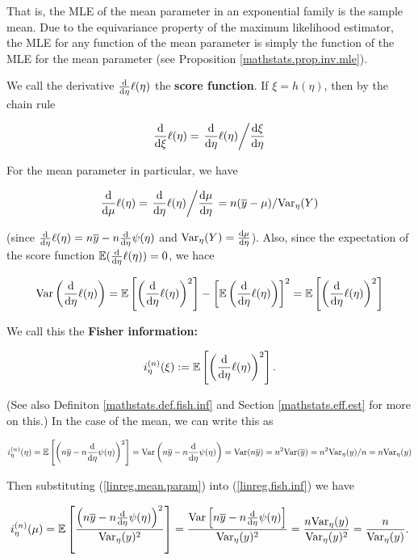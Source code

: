 \begin{enumerate}
That is, the MLE of the mean parameter in an exponential family is the sample mean. Due to the equivariance property of the maximum likelihood estimator, the MLE for any function of the mean parameter is simply the function of the MLE for the mean parameter (see Proposition \ref{mathstats.prop.inv.mle}). 

We call the derivative \(\frac{\mathrm{d} }{\mathrm{d} \eta} \ell(\eta) \) the \textbf{score function}. If \(\xi = h(\eta)\), then by the chain rule

\[
\frac{\mathrm{d} }{\mathrm{d} \xi} \ell(\eta) = \left. \frac{\mathrm{d} }{\mathrm{d} \eta} \ell(\eta)  \middle/ \frac{\mathrm{d} \xi}{\mathrm{d} \eta}  \right.
\]

For the mean parameter in particular, we have 

\begin{equation}\label{linreg.mean.param}
\frac{\mathrm{d} }{\mathrm{d} \mu} \ell(\eta) = \left. \frac{\mathrm{d} }{\mathrm{d} \eta} \ell(\eta)  \middle/ \frac{\mathrm{d} \mu}{\mathrm{d} \eta}  \right. =  n (\overline{y} - \mu)/ \mathrm{Var}_\eta (Y)
\end{equation}

(since \(\frac{\mathrm{d} }{\mathrm{d} \eta} \ell(\eta) = n \overline{y} - n \frac{\mathrm{d} }{\mathrm{d} \eta} \psi(\eta)\) and \(\mathrm{Var}_\eta(Y) =\frac{\mathrm{d} \mu}{\mathrm{d} \eta} \)). Also, since the expectation of the score function \(\mathbb{E}(\frac{\mathrm{d} }{\mathrm{d} \eta} \ell(\eta)) = 0\), we hace 

\[
\mathrm{Var} \left( \frac{\mathrm{d} }{\mathrm{d} \eta} \ell(\eta) \right) = \mathbb{E}  \left[ \left( \frac{\mathrm{d} }{\mathrm{d} \eta} \ell(\eta) \right)^2  \right] - \left[ \mathbb{E} \left(  \frac{\mathrm{d} }{\mathrm{d} \eta} \ell(\eta) \right) \right]^2 = \mathbb{E}  \left[ \left( \frac{\mathrm{d} }{\mathrm{d} \eta} \ell(\eta) \right)^2  \right]
\]

We call this the \textbf{Fisher information:}

\begin{equation}\label{linreg.fish.inf}
i_\eta^{(n)} (\xi) := \mathbb{E}  \left[ \left( \frac{\mathrm{d} }{\mathrm{d} \eta} \ell(\eta) \right)^2  \right].
\end{equation}

(See also Definiton \ref{mathstats.def.fish.inf} and Section \ref{mathstats.eff.est} for more on this.) In the case of the mean, we can write this as 

\[
i_\eta^{(n)} (\eta) = \mathbb{E}  \left[ \left( n \overline{y} - n \frac{\mathrm{d} }{\mathrm{d} \eta} \psi(\eta) \right)^2  \right] = \mathrm{Var} \left(n \overline{y} - n \frac{\mathrm{d} }{\mathrm{d} \eta} \psi(\eta) \right) = \mathrm{Var}( n \overline{y}) = n^2 \mathrm{Var}(\overline{y}) = n^2 \mathrm{Var}_\eta(y)/n = n \mathrm{Var}_\eta(y)
\]

 Then substituting (\ref{linreg.mean.param}) into (\ref{linreg.fish.inf}) we have 

\begin{equation}\label{linreg.fish.inf.mean.unb}
i_\eta^{(n)} (\mu) =  \mathbb{E} \left[ \frac{ \left(n \overline{y} - n \frac{\mathrm{d} }{\mathrm{d} \eta} \psi(\eta) \right)^2 }{ \mathrm{Var}_\eta(y) ^2} \right] =  \frac{  \mathrm{Var} \left[ n \overline{y} - n \frac{\mathrm{d} }{\mathrm{d} \eta} \psi(\eta)  \right] }{ \mathrm{Var}_\eta(y) ^2}   = \frac{n \mathrm{Var}_\eta(y)}{\mathrm{Var}_\eta(y)^2} = \frac{n}{\mathrm{Var}_\eta(y)}.
\end{equation}


\end{enumerate}
